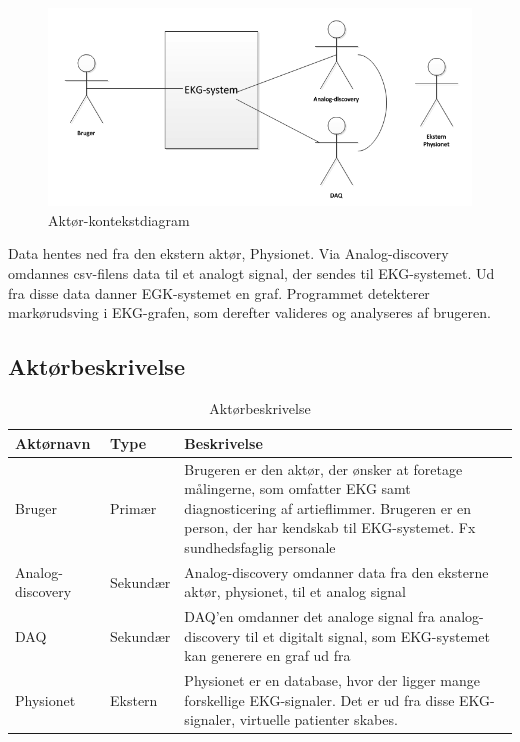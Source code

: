 \begin{figure}[htb]
	\centering
	\includegraphics[width=1\textwidth]{Figurer/Snip20150409_30}
	\caption{Aktør-kontekstdiagram}
	\label{fig:aktoerbeskrivelse}
\end{figure}

Data hentes ned fra den ekstern aktør, Physionet. Via Analog-discovery omdannes csv-filens data til et analogt signal, der sendes til EKG-systemet. Ud fra disse data danner EGK-systemet en graf. Programmet detekterer markørudsving i EKG-grafen, som derefter valideres og analyseres af brugeren.

\subsection{Aktørbeskrivelse}

\begin{table}[H]
\begin{tabularx}{\textwidth}{l l X}
     Aktørnavn  & Type      & Beskrivelse \\ \midrule
     Bruger   & Primær    & Brugeren er den aktør, der ønsker at foretage målingerne, som omfatter EKG samt diagnosticering af artieflimmer. Brugeren er en person, der har kendskab til EKG-systemet. Fx sundhedsfaglig personale \\ 						  									  \addlinespace[2mm]
     Analog-discovery & Sekundær  & Analog-discovery omdanner data fra den eksterne aktør, physionet, til et analog signal \\ 
     	\addlinespace[2mm]
     DAQ & Sekundær  & DAQ'en omdanner det analoge signal fra analog-discovery til et digitalt signal, som EKG-systemet kan generere en graf ud fra  \\ 
     	\addlinespace[2mm]
     Physionet & Ekstern 	& Physionet er en database, hvor der ligger mange forskellige EKG-signaler. Det er ud fra disse EKG-signaler, virtuelle patienter skabes.\\	                                                                                                                                                                           
   
     \bottomrule                                                                                                                   
    \end{tabularx}
    \caption {Aktørbeskrivelse}
    \label{tab:aktoerbeskrivelse}
	
\end{table}

